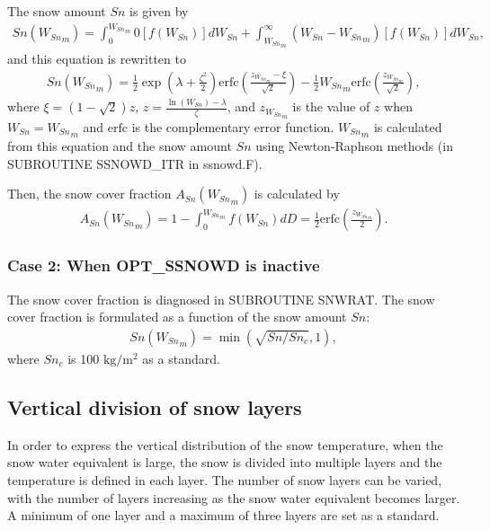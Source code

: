 The snow amount \(Sn\) is given by \begin{eqnarray}
Sn({W_{Sn}}_m)
 = \int_0^{{W_{Sn}}_m} 0[f(W_{Sn})]dW_{Sn}
 + \int_{{W_{Sn}}_m}^\infty (W_{Sn}-{W_{Sn}}_m)[f(W_{Sn})]dW_{Sn}, \label{8-3}
\end{eqnarray} and this equation is rewritten to \begin{eqnarray}
Sn({W_{Sn}}_m)
 = \frac{1}{2} \exp{\left( \lambda + \frac{\zeta^2}{2} \right)}
 \mathrm{erfc} \left( \frac{z_{{W_{Sn}}_m}-\xi}{\sqrt{2}} \right)
 - \frac{1}{2} {W_{Sn}}_m \mathrm{erfc} \left( \frac{z_{{W_{Sn}}_m}}{\sqrt{2}} \right), \label{8-4}
\end{eqnarray} where \(\xi = (1-\sqrt{2})z\), \(z = \frac{\ln(W_{Sn})-\lambda}{\zeta}\), and \(z_{{W_{Sn}}_m}\) is the value of \(z\) when \(W_{Sn} = {W_{Sn}}_m\) and \(\mathrm{erfc}\) is the complementary error
function. \({W_{Sn}}_m\) is calculated from this equation and the snow amount \(Sn\) using Newton-Raphson methods (in SUBROUTINE SSNOWD\_ITR in ssnowd.F).

Then, the snow cover fraction \(A_{Sn}({W_{Sn}}_m)\) is calculated by \begin{eqnarray}
A_{Sn}({W_{Sn}}_m) = 1 - \int_0^{{W_{Sn}}_m} f(W_{Sn})dD
= \frac{1}{2} \mathrm{erfc} \left( \frac{z_{{W_{Sn}}_m}}{2} \right). \label{8-5}
\end{eqnarray}

\subsubsection{Case 2: When OPT\_SSNOWD is inactive}\label{case-2-when-opt_ssnowd-is-inactive}

The snow cover fraction is diagnosed in SUBROUTINE SNWRAT. The snow cover fraction is formulated as a function of the snow amount \(Sn\): \begin{eqnarray}
Sn({W_{Sn}}_m) = \min(\sqrt{Sn/Sn_c},1), \label{8-6}
\end{eqnarray} where \(Sn_c\) is 100 \(\mathrm{kg/m^2}\) as a standard.

\subsection{Vertical division of snow layers}\label{vertical-division-of-snow-layers}

In order to express the vertical distribution of the snow temperature, when the snow water equivalent is large, the snow is divided into multiple layers and the temperature is defined in each layer.
The number of snow layers can be varied, with the number of layers increasing as the snow water equivalent becomes larger. A minimum of one layer and a maximum of three layers are set as a standard.

